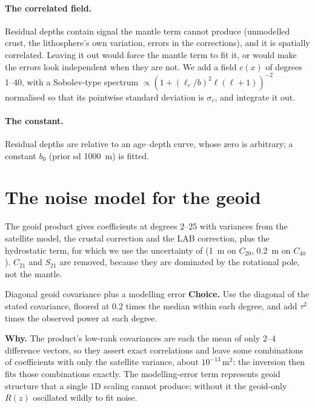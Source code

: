 \paragraph{The correlated field.}
Residual depths contain signal the mantle term cannot produce (unmodelled crust, the lithosphere's own variation, errors in the corrections), and it is spatially correlated.
Leaving it out would force the mantle term to fit it, or would make the errors look independent when they are not.
We add a field $c(x)$ of degrees 1--40, with a Sobolev-type spectrum $\propto(1 + (\ell_c/b)^2\ell(\ell+1))^{-2}$ normalised so that its pointwise standard deviation is $\sigma_c$, and integrate it out.

\paragraph{The constant.}
Residual depths are relative to an age--depth curve, whose zero is arbitrary; a constant $b_0$ (prior sd \qty{1000}{m}) is fitted.

\section{The noise model for the geoid}

The geoid product gives coefficients at degrees 2--25 with variances from the satellite model, the crustal correction and the LAB correction, plus the hydrostatic term, for which we use the uncertainty of \citet{chambat_flattening_2010} (\qty{1}{m} on $C_{20}$, \qty{0.2}{m} on $C_{40}$).
$C_{21}$ and $S_{21}$ are removed, because they are dominated by the rotational pole, not the mantle.

\begin{decision}{Diagonal geoid covariance plus a modelling error}
\textbf{Choice.} Use the diagonal of the stated covariance, floored at 0.2 times the median within each degree, and add $\tau^2$ times the observed power at each degree.

\textbf{Why.} The product's low-rank covariances are each the mean of only 2--4 difference vectors, so they assert exact correlations and leave some combinations of coefficients with only the satellite variance, about $10^{-13}\,\mathrm{m}^2$: the inversion then fits those combinations exactly.
The modelling-error term represents geoid structure that a single 1D scaling cannot produce; without it the geoid-only $R(z)$ oscillated wildly to fit noise.
\end{decision}

